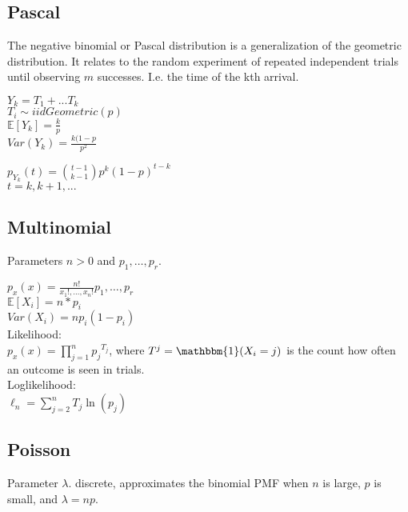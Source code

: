 \subsection*{Pascal}

The negative binomial or Pascal distribution is a generalization of the geometric distribution. It relates to the random experiment of repeated independent trials until observing $m$ successes. I.e. the time of the kth arrival.

$Y_k=T_1+...T_k$\\

$T_i \sim iid Geometric(p)$\\

$\mathbb{E}[Y_k]=\frac{k}{p}$\\

$Var(Y_k)= \frac{k(1-p}{p^2}$

$p_{Y_k}(t) ={t-1 \choose k-1}p^k(1-p)^{t-k}$\\

$t=k,k+1,...$


\subsection*{Multinomial}

Parameters $n>0$ and $p_1, \ldots, p_r$.

$p_x(x)= \frac{n!}{x_1!,\ldots,x_n!} p_1, \ldots, p_r$\\


$\mathbb{E}[X_i]=n*p_i$\\

$Var(X_i)=np_i(1-p_i)$\\


Likelihood:\\

$p_x(x)= \prod _{j=1}^{n}{p_{{j}}}^{T_{{j}}}$, where $T^j=\mathbbm{1}( X_i=j)$ is the count how often an outcome is seen in trials. \\

Loglikelihood:\\
$\ell_n= \sum _{j=2}^{n}T_{{j}}\ln  \left( p_{{j}} \right)$\\


\subsection*{Poisson}
Parameter $\lambda$. discrete, approximates the binomial PMF when $n$ is large, $p$ is small, and $\lambda = np$.\\

